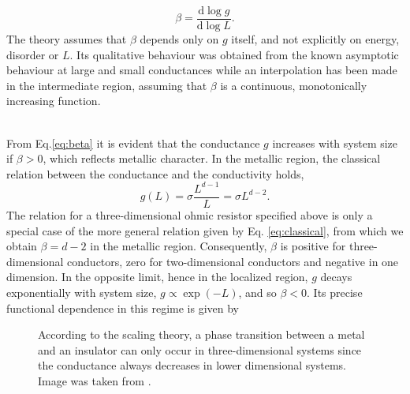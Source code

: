 \documentclass[10pt,a4paper]{article}
\begin{document}
\begin{equation}\label{eq:beta}
\beta=\frac{\mathrm{d}\log g}{\mathrm{d}\log L}.
\end{equation}
The theory assumes that $\beta$ depends only on $g$ itself, and not explicitly on energy, disorder or $L$. 
Its qualitative behaviour was obtained from the known asymptotic behaviour at large and small conductances
while an interpolation has been made in the intermediate region, assuming that $\beta$ is a continuous, monotonically increasing function. 
\\\\
\noindent
\begin{minipage}[t]{0.57\textwidth}
From Eq.\eqref{eq:beta} it is evident that the conductance $g$ increases with system size if $\beta>0$, which reflects metallic character. In the metallic region, the classical relation between the conductance and the conductivity holds,
\begin{equation}\label{eq:classical}
g(L)=\sigma \frac{L^{d-1}}{L}=\sigma L^{d-2}. 
\end{equation}
The relation for a three-dimensional ohmic resistor specified above is only a special case of the more general relation given by Eq. \eqref{eq:classical}, from which we obtain $\beta=d-2$ in the metallic region.
Consequently, $\beta$ is positive for three-dimensional conductors, zero for two-dimensional conductors and negative in one dimension. In the opposite limit, hence in the localized region, $g$ decays exponentially with system size, $g \propto \exp(-L)$, and so $\beta<0$.  Its precise functional dependence in this regime is given by 
\end{minipage}\hfill
\begin{minipage}[t]{0.42\textwidth}
\begin{figure}[H]
\caption{According to the scaling theory, a phase transition between a metal and an insulator can only occur in three-dimensional systems since the conductance always decreases in lower dimensional systems. Image was taken from \cite{50yearsof}.}
\label{fig:scalingtheory} 
\end{figure}
\end{minipage}\\\\
\noindent
\end{document}
